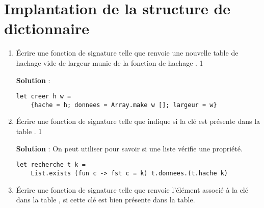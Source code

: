 \documentclass[10pt,a4paper, varwidth]{article}
\def\cor{1}
\begin{document}
	\section{Implantation de la structure de dictionnaire}
	\begin{enumerate}
		\item Écrire une fonction  de signature 
		telle que  renvoie une nouvelle table de hachage vide de largeur  munie de la fonction de
		hachage .
        \if\cor1
        \begin{emphase}
            \textbf{Solution} : 
            \begin{center}
                \begin{minipage}{.7\textwidth}
                \begin{verbatim}
let creer h w =
    {hache = h; donnees = Array.make w []; largeur = w}
                \end{verbatim}
                \end{minipage}
            \end{center}
        \end{emphase}
        \fi
		\item Écrire une fonction  de signature  telle que 
		indique si la clé  est présente dans la table .
		\if\cor1
        \begin{emphase}
            \textbf{Solution} : On peut utiliser  pour savoir si une liste vérifie une propriété.
            \begin{center}
                \begin{minipage}{.7\textwidth}
                \begin{verbatim}
let recherche t k =
    List.exists (fun c -> fst c = k) t.donnees.(t.hache k) 
                \end{verbatim}
                \end{minipage}
            \end{center}
        \end{emphase}
        \fi
        \item Écrire une fonction  de signature  telle que  renvoie
		l'élément associé à la clé  dans la table , si cette clé est bien présente dans la table.

\end{enumerate}
\end{document}

